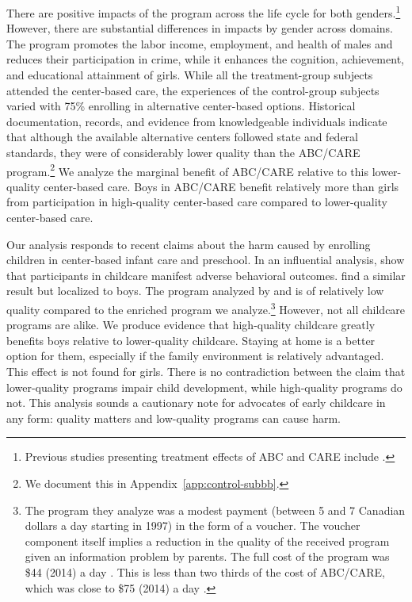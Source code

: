 There are positive impacts of the program across the life cycle for both genders.\footnote{Previous studies presenting treatment effects of ABC and CARE include \citet{Ramey_etal_1985_Project-CARE_TiECSE,Clarke_Campbell_1998_ABC_Comparison_ECRQ,Campbell_Pungello_etal_2001_DP,Campbell_Ramey_etal_2002_ADS,Campbell_Wasik_etal_2008_ECRQ,Campbell_Conti_etal_2014_EarlyChildhoodInvestments}.} However, there are substantial differences in impacts by gender across domains. The program promotes the labor income, employment, and health of males and reduces their participation in crime, while it enhances the cognition, achievement, and educational attainment of girls. While all the treatment-group subjects attended the center-based care, the experiences of the control-group subjects varied with 75\% enrolling in alternative center-based options. Historical documentation, records, and evidence from knowledgeable individuals indicate that although the available alternative centers followed state and federal standards, they were of considerably lower quality than the ABC/CARE program.\footnote{We document this in Appendix~\ref{app:control-subbb}.} We analyze the marginal benefit of ABC/CARE relative to this lower-quality center-based care. Boys in ABC/CARE benefit relatively more than girls from participation in high-quality center-based care compared to lower-quality center-based care.

Our analysis responds to recent claims about the harm caused by enrolling children in center-based infant care and preschool. In an influential analysis, \citet{Baker_Gruber_etal_2008_JPE} show that participants in childcare manifest adverse behavioral outcomes. \citet{Kottelenberg_Lehrer_2014_Gender-Effects} find a similar result but localized to boys.  The program analyzed by \citet{Baker_Gruber_Milligan_2015_Noncog_Defects} and \citet{Kottelenberg_Lehrer_2014_Gender-Effects} is of relatively low quality compared to the enriched program we analyze.\footnote{The program they analyze was a modest payment (between 5 and 7 Canadian dollars a day starting in 1997) in the form of a voucher. The voucher component itself implies a reduction in the quality of the received program given an information problem by parents. The full cost of the program was \$44 (2014) a day \citep{Baker_etal_2005_Universal_Childcare_NBER}. This is less than two thirds of the cost of ABC/CARE, which was close to \$75 (2014) a day \citep{Garcia_Heckman_Leaf_etal_2017_Comp_CBA_Unpublished}.} However, not all childcare programs are alike. We produce evidence that high-quality childcare greatly benefits boys relative to lower-quality childcare. Staying at home is a better option for them, especially if the family environment is relatively advantaged. This effect is not found for girls. There is no contradiction between the claim that lower-quality programs impair child development, while high-quality programs do not. This analysis sounds a cautionary note for advocates of early childcare in any form: quality matters and low-quality programs can cause harm.

